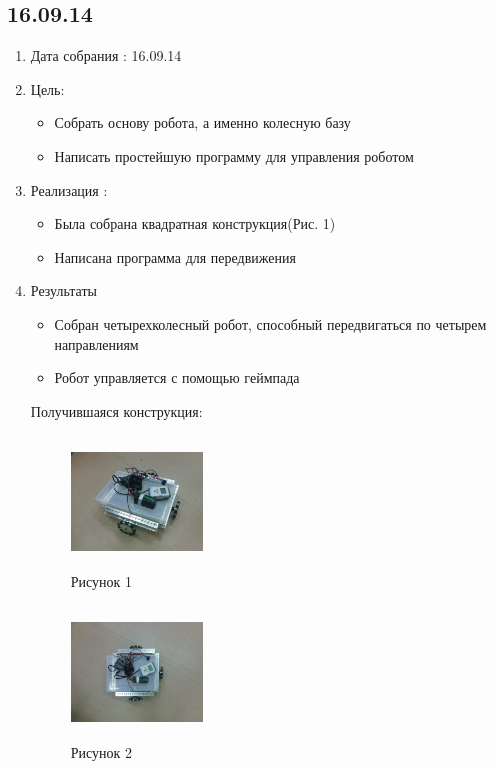 \documentclass[11pt]{article}
\begin{document}
	\subsection{16.09.14}
	\begin{enumerate}
		\item Дата собрания : 16.09.14
		\item Цель:
		\begin{itemize}
			\item Собрать основу робота, а именно колесную базу
			\item Написать простейшую программу для управления роботом
		\end{itemize}			
		\item Реализация :
		\begin{itemize}
			\item Была собрана квадратная конструкция(Рис. 1)
			\item Написана программа для передвижения
		\end{itemize}
		\item Результаты
		\begin{itemize}
			\item Собран четырехколесный робот, способный передвигаться по четырем направлениям
			\item Робот управляется с помощью геймпада
		\end{itemize}
		Получившаяся конструкция:
		\begin{figure} [h]
			\centering
			\begin{minipage}{0.3\linewidth}
				\includegraphics[width=35mm,height=35mm]{1_1_robot}\\ Рисунок 1
			\end{minipage}
			\begin{minipage}{0.3\linewidth}
				\includegraphics[width=35mm,height=35mm]{1_2_robot}\\ Рисунок 2
			\end{minipage}
		\end{figure}
	\end{enumerate}
	\newpage
	
\end{document}
